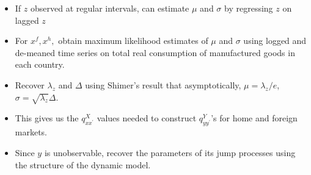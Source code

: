 \documentclass[notes=show]{beamer}
\begin{document}
\begin{frame}%

\begin{flushleft}

\end{flushleft}

\begin{itemize}
\item If $z$ observed at regular intervals, can estimate $\mu $ and $\sigma $
by regressing $z$ on lagged $z$

\item For $x^{f},x^{h},$ obtain maximum likelihood estimates of $\mu $ and $%
\sigma $ using logged and de-meaned time series on total real consumption of
manufactured goods in each country.

\item Recover $\lambda _{z}$ and $\Delta $ using Shimer's result that
asymptotically, $\mu =\lambda _{z}/e$, $\sigma =\sqrt{\lambda _{z}}\Delta $.

\item This gives us the $q_{xx^{\prime }}^{X}$ values needed to construct $%
q_{yy^{\prime }}^{Y}$'s for home and foreign markets.

\item Since $y$ is unobservable, recover the parameters of its jump
processes using the structure of the dynamic model.
\end{itemize}

\end{frame}%
\end{document}

